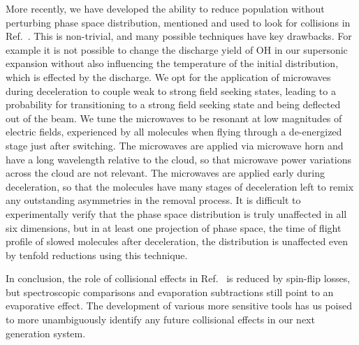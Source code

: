 \documentclass[%
 reprint,
 amsmath,amssymb,
 aps,
pra,
]{revtex4-1}
\begin{document}
More recently, we have developed the ability to reduce population without perturbing phase space distribution, mentioned and used to look for collisions in Ref.~\cite{smt}.
This is non-trivial, and many possible techniques have key drawbacks. 
For example it is not possible to change the discharge yield of OH in our supersonic expansion without also influencing the temperature of the initial distribution, which is effected by the discharge.
We opt for the application of microwaves during deceleration to couple weak to strong field seeking states, leading to a probability for transitioning to a strong field seeking state and being deflected out of the beam. 
We tune the microwaves to be resonant at low magnitudes of electric fields, experienced by all molecules when flying through a de-energized stage just after switching.
The microwaves are applied via microwave horn and have a long wavelength relative to the cloud, so that microwave power variations across the cloud are not relevant.
The microwaves are applied early during deceleration, so that the molecules have many stages of deceleration left to remix any outstanding asymmetries in the removal process.
It is difficult to experimentally verify that the phase space distribution is truly unaffected in all six dimensions, but in at least one projection of phase space, the time of flight profile of slowed molecules after deceleration, the distribution is unaffected even by tenfold reductions using this technique.


In conclusion, the role of collisional effects in Ref.~\cite{Stuhl2013} is reduced by spin-flip losses,
but spectroscopic comparisons and evaporation subtractions still point to an evaporative effect. 
The development of various more sensitive tools has us poised to more unambiguously identify any future collisional effects in our next generation system.
\end{document}
